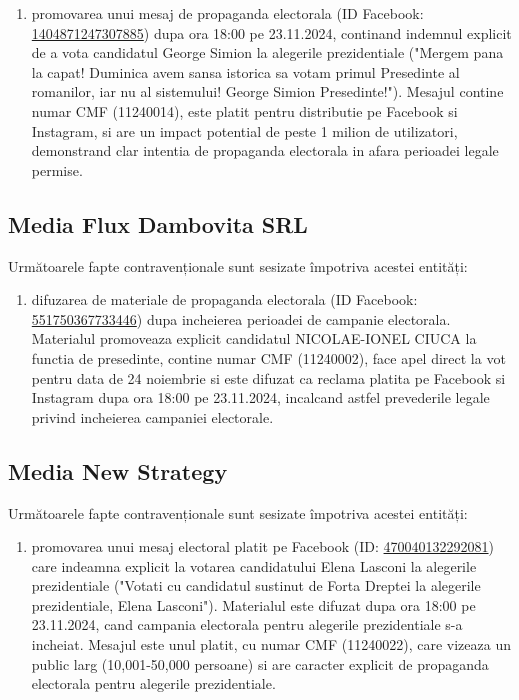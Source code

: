 \documentclass[a4paper,12pt]{article}
\begin{document}
\begin{enumerate}[leftmargin=*, label=\arabic*.)]
    \item promovarea unui mesaj de propaganda electorala (ID Facebook: \href{https://www.facebook.com/ads/library/?id=1404871247307885}{1404871247307885}) dupa ora 18:00 pe 23.11.2024, continand indemnul explicit de a vota candidatul George Simion la alegerile prezidentiale ("Mergem pana la capat! Duminica avem sansa istorica sa votam primul Presedinte al romanilor, iar nu al sistemului! George Simion Presedinte!"). Mesajul contine numar CMF (11240014), este platit pentru distributie pe Facebook si Instagram, si are un impact potential de peste 1 milion de utilizatori, demonstrand clar intentia de propaganda electorala in afara perioadei legale permise.
\end{enumerate}

\vspace{0.5cm}

\subsection{Media Flux Dambovita SRL}
Următoarele fapte contravenționale sunt sesizate împotriva acestei entități:

\begin{enumerate}[leftmargin=*, label=\arabic*.)]
    \item difuzarea de materiale de propaganda electorala (ID Facebook: \href{https://www.facebook.com/ads/library/?id=551750367733446}{551750367733446}) dupa incheierea perioadei de campanie electorala. Materialul promoveaza explicit candidatul NICOLAE-IONEL CIUCA la functia de presedinte, contine numar CMF (11240002), face apel direct la vot pentru data de 24 noiembrie si este difuzat ca reclama platita pe Facebook si Instagram dupa ora 18:00 pe 23.11.2024, incalcand astfel prevederile legale privind incheierea campaniei electorale.
\end{enumerate}

\vspace{0.5cm}

\subsection{Media New Strategy}
Următoarele fapte contravenționale sunt sesizate împotriva acestei entități:

\begin{enumerate}[leftmargin=*, label=\arabic*.)]
    \item promovarea unui mesaj electoral platit pe Facebook (ID: \href{https://www.facebook.com/ads/library/?id=470040132292081}{470040132292081}) care indeamna explicit la votarea candidatului Elena Lasconi la alegerile prezidentiale ("Votati cu candidatul sustinut de Forta Dreptei la alegerile prezidentiale, Elena Lasconi"). Materialul este difuzat dupa ora 18:00 pe 23.11.2024, cand campania electorala pentru alegerile prezidentiale s-a incheiat. Mesajul este unul platit, cu numar CMF (11240022), care vizeaza un public larg (10,001-50,000 persoane) si are caracter explicit de propaganda electorala pentru alegerile prezidentiale.
\end{enumerate}
\end{document}
